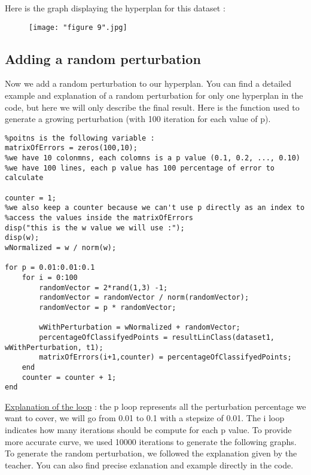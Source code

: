 \documentclass[a4paper]{article}
\begin{document}
	Here is the graph displaying the hyperplan for this dataset :
	\begin{figure}[h]
		\begin{center}
			\texttt{[image: "figure 9".jpg]}
		\end{center}
	\end{figure}
	
	\pagebreak
	
	\subsection{Adding a random perturbation}
	Now we add a random perturbation to our hyperplan. You can find a detailed example and explanation of a random perturbation for only one hyperplan in the code, but here we will only describe the final result. Here is the function used to generate a growing perturbation (with 100 iteration for each value of p).
	
\begin{lstlisting}[frame=single]
%we are going to store the percentage of correctly classifyed
%poitns is the following variable :
matrixOfErrors = zeros(100,10);
%we have 10 colonmns, each colomns is a p value (0.1, 0.2, ..., 0.10)
%we have 100 lines, each p value has 100 percentage of error to calculate

counter = 1; 
%we also keep a counter because we can't use p directly as an index to
%access the values inside the matrixOfErrors
disp("this is the w value we will use :");
disp(w);
wNormalized = w / norm(w);

for p = 0.01:0.01:0.1
	for i = 0:100
		randomVector = 2*rand(1,3) -1;
		randomVector = randomVector / norm(randomVector);
		randomVector = p * randomVector;

		wWithPerturbation = wNormalized + randomVector;
		percentageOfClassifyedPoints = resultLinClass(dataset1, wWithPerturbation, t1);
		matrixOfErrors(i+1,counter) = percentageOfClassifyedPoints;
	end
	counter = counter + 1;
end
\end{lstlisting}


	\underline{Explanation of the loop} : the p loop represents all the perturbation percentage we want to cover, we will go from 0.01 to 0.1 with a stepsize of 0.01. The i loop indicates how many iterations should be compute for each p value. To provide more accurate curve, we used 10000 iterations to generate the following graphs. To generate the random perturbation, we followed the explanation given by the teacher. You can also find precise exlanation and example directly in the code.
	
\end{document}
